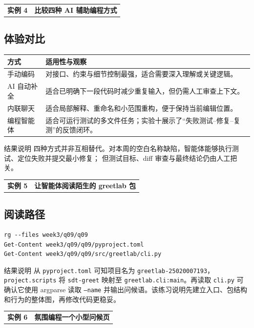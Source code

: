 \documentclass[UTF8,zihao=-4]{ctexart}
\newcommand{\practicebanner}[2]{
  \begin{tcolorbox}[
    colback=soft,
    colframe=navy,
    boxrule=1pt,
    arc=2mm,
    left=4mm,right=4mm,top=2.5mm,bottom=2.5mm]
    \begin{tabularx}{\textwidth}{>{\Large\bfseries\color{navy}}p{2.7cm}X}
      实例 #1 & {\large\bfseries\color{navy}#2}
    \end{tabularx}
  \end{tcolorbox}
}
\begin{document}
\clearpage
\practicebanner{4}{比较四种 AI 辅助编程方式}

\subsection*{体验对比}
\begin{table}[H]
  \centering
  \renewcommand{\arraystretch}{1.30}
  \begin{tabularx}{\textwidth}{p{2.4cm}X}
    \toprule
    方式 & 适用性与观察 \\
    \midrule
    手动编码 & 对接口、约束与细节控制最强，适合需要深入理解或关键逻辑。 \\
    AI 自动补全 & 适合已明确下一段代码时减少重复输入，但仍需人工审查上下文。 \\
    内联聊天 & 适合局部解释、重命名和小范围重构，便于保持当前编辑位置。 \\
    编程智能体 & 适合可运行测试的多文件任务；实验十展示了“失败测试--修复--复测”的反馈闭环。 \\
    \bottomrule
  \end{tabularx}
\end{table}

\begin{summarybox}{结果说明}
四种方式并非互相替代。对本周的空白名称缺陷，智能体能够执行测试、定位失败并提交最小修复；
但测试目标、diff 审查与最终结论仍由人工把关。
\end{summarybox}

\clearpage
\practicebanner{5}{让智能体阅读陌生的 greetlab 包}

\subsection*{阅读路径}
\begin{lstlisting}[style=shell]
rg --files week3/q09/q09
Get-Content week3/q09/q09/pyproject.toml
Get-Content week3/q09/q09/src/greetlab/cli.py
\end{lstlisting}

\begin{summarybox}{结果说明}
从 \texttt{pyproject.toml} 可知项目名为 \texttt{greetlab-25020007193}，
\texttt{project.scripts} 将 \texttt{sdt-greet} 映射至
\texttt{greetlab.cli:main}。再读取 \texttt{cli.py} 可确认它使用 argparse 读取
\texttt{--name} 并输出问候语。该练习说明先建立入口、包结构和行为的整体图，再修改代码更稳妥。
\end{summarybox}

\practicebanner{6}{氛围编程一个小型问候页}
\end{document}
